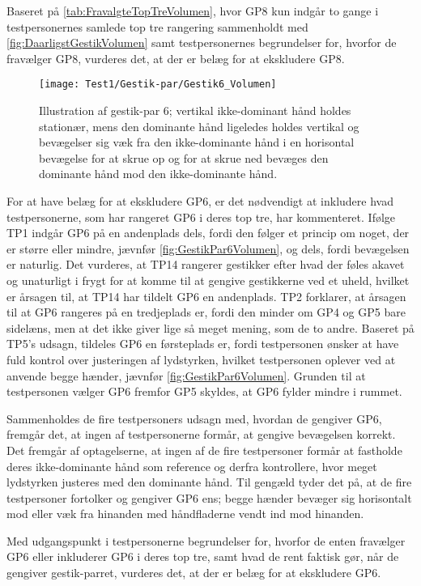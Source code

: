 %
Baseret på \autoref{tab:FravalgteTopTreVolumen}, hvor GP8 kun indgår to gange i testpersonernes samlede top tre rangering sammenholdt med \autoref{fig:DaarligstGestikVolumen} samt testpersonernes begrundelser for, hvorfor de fravælger GP8, vurderes det, at der er belæg for at ekskludere GP8. 
%
\begin{figure}[H]
	\centering
	\texttt{[image: Test1/Gestik-par/Gestik6\_Volumen]}
	\caption{Illustration af gestik-par 6; vertikal ikke-dominant hånd holdes stationær, mens den dominante hånd ligeledes holdes vertikal og bevægelser sig væk fra den ikke-dominante hånd i en horisontal bevægelse for at skrue op og for at skrue ned bevæges den dominante hånd mod den ikke-dominante hånd.}
	\label{fig:GestikPar6Volumen}
\end{figure}
\noindent
% 
For at have belæg for at ekskludere GP6, er det nødvendigt at inkludere hvad testpersonerne, som har rangeret GP6 i deres top tre, har kommenteret. Ifølge TP1 indgår GP6 på en andenplads dels, fordi den følger et princip om noget, der er større eller mindre, jævnfør \autoref{fig:GestikPar6Volumen}, og dels, fordi bevægelsen er naturlig. Det vurderes, at TP14 rangerer gestikker efter hvad der føles akavet og unaturligt i frygt for at komme til at gengive gestikkerne ved et uheld, hvilket er årsagen til, at TP14 har tildelt GP6 en andenplads. TP2 forklarer, at årsagen til at GP6 rangeres på en tredjeplads er, fordi den minder om GP4 og GP5 bare sidelæns, men at det ikke giver lige så meget mening, som de to andre. Baseret på TP5's udsagn, tildeles GP6 en førsteplads er, fordi testpersonen ønsker at have fuld kontrol over justeringen af lydstyrken, hvilket testpersonen oplever ved at anvende begge hænder, jævnfør \autoref{fig:GestikPar6Volumen}. Grunden til at testpersonen vælger GP6 fremfor GP5 skyldes, at GP6 fylder mindre i rummet. 

Sammenholdes de fire testpersoners udsagn med, hvordan de gengiver GP6, fremgår det, at ingen af testpersonerne formår, at gengive bevægelsen korrekt. Det fremgår af optagelserne, at ingen af de fire testpersoner formår at fastholde deres ikke-dominante hånd som reference og derfra kontrollere, hvor meget lydstyrken justeres med den dominante hånd. Til gengæld tyder det på, at de fire testpersoner fortolker og gengiver GP6 ens; begge hænder bevæger sig horisontalt mod eller væk fra hinanden med håndfladerne vendt ind mod hinanden. 

Med udgangspunkt i testpersonerne begrundelser for, hvorfor de enten fravælger GP6 eller inkluderer GP6 i deres top tre, samt hvad de rent faktisk gør, når de gengiver gestik-parret, vurderes det, at der er belæg for at ekskludere GP6. 
